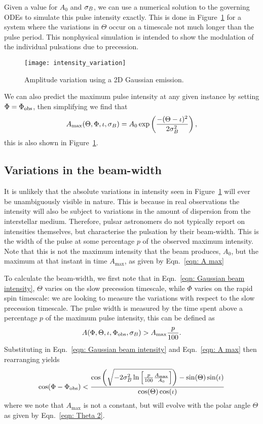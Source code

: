 \documentclass[../full_thesis/full_thesis.tex]{subfiles}
\begin{document}
Given a value for $A_0$ and $\sigma_{B}$, we can use a numerical solution to the
governing ODEs to simulate this pulse intensity exactly. This is done in
Figure~\ref{fig: intensity variation} for a system where the variations in
$\Theta$ occur on a timescale not much longer than the pulse period. This
nonphysical simulation is intended to show the modulation of the individual
pulsations due to precession.
\begin{figure}[htb]
\centering
\texttt{[image: intensity\_variation]}
\caption{Amplitude variation using a 2D Gaussian emission.}
\label{fig: intensity variation}
\end{figure}
We can also predict the maximum pulse intensity at any given instance by setting
$\Phi=\Phi_{\mathrm{obs}}$, then simplifying we find that
\begin{align}
A_{\mathrm{max}}(\Theta, \Phi, \iota, \sigma_{B}) =
A_{0}\exp\left(\frac{-(\Theta-\iota)^{2}}{2\sigma_{B}^{2}}\right),
\label{eqn: A max}
\end{align}
this is also shown in Figure~\ref{fig: intensity variation}.

\subsection{Variations in the beam-width}
\label{sec: numerical beam-width}
It is unlikely that the absolute variations in intensity seen in
Figure~\ref{fig: intensity variation} will ever be unambiguously visible in
nature. This is because in real observations the intensity will also be subject
to variations in the amount of dispersion from the interstellar medium.
Therefore, pulsar astronomers do not typically report on intensities
themselves, but characterise the pulsation by their beam-width. This is the
width of the pulse at some percentage $p$ of the observed maximum intensity.
Note that this is not the maximum intensity that the beam produces, $A_0$, but
the maximum at that instant in time $A_{\mathrm{max}}$, as given by
Eqn.~\eqref{eqn: A max}

To calculate the beam-width, we first note that in Eqn.~\eqref{eqn: Gaussian
beam intensity}, $\Theta$ varies on the slow precession timescale, while $\Phi$
varies on the rapid spin timescale: we are looking to measure the variations
with respect to the slow precession timescale.  The pulse width is measured by
the time spent above a percentage $p$ of the maximum pulse intensity, this can
be defined as
\begin{align}
A(\Phi, \Theta, \iota, \Phi_{\mathrm{obs}}, \sigma_{B}) > A_{\textrm{max}} \frac{p}{100}.
\end{align}
Substituting in Eqn.~\eqref{eqn: Gaussian beam intensity} and Eqn.~\eqref{eqn: A max}
then rearranging yields
\begin{equation}
\cos(\Phi - \Phi_{\mathrm{obs}}) < \frac{
\cos\left(
\sqrt{-2\sigma_{B}^{2}
\ln\left[\frac{p}{100}\frac{A_\textrm{max}}{A_0}\right]}\right) -
\sin(\Theta)\sin(\iota)} {\cos(\Theta)\cos(\iota)}
\label{eqn: 6737}
\end{equation}
where we note that $A_\textrm{max}$ is not a constant, but will evolve with the
polar angle $\Theta$ as given by Eqn.~\eqref{eqn: Theta 2}.
\end{document}
